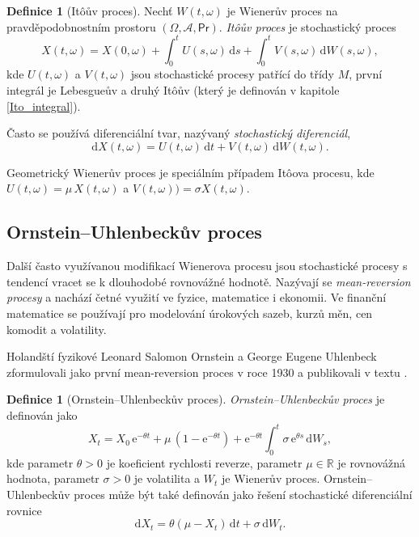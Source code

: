 \documentclass[a4paper,12pt]{report}
\theoremstyle{definition} \newtheorem{definice}[veta]{Definice}
\theoremstyle{remark}
\begin{document}
\begin{definice}[It\^oův proces]
Nechť $W(t,\omega)$ je Wienerův proces na pravděpodobnostním prostoru $(\Omega,\mathcal{A},\mathsf{Pr})$.
\textit{It\^oův proces} je stochastický proces
$$X(t,\omega)=X(0,\omega)+\int_0^tU(s,\omega)\,\mathrm{d}s+\int_0^tV(s,\omega)\,\mathrm{d}W(s,\omega),$$
kde $U(t,\omega)$ a $V(t,\omega)$ jsou stochastické procesy patřící do třídy $M$,
první integrál je Lebesgueův a druhý It\^oův (který je definován v kapitole \ref{Ito_integral}).

Často se používá diferenciální tvar, nazývaný \textit{stochastický diferenciál},
$$\mathrm{d}X(t,\omega)=U(t,\omega)\,\mathrm{d}t+V(t,\omega)\,\mathrm{d}W(t,\omega).$$
\end{definice}

Geometrický Wienerův proces je speciálním případem It\^oova procesu, kde $U(t,\omega)=\mu\,X(t,\omega)$ a $V(t,\omega))=\sigma X(t,\omega)$.

\subsection{Ornstein–Uhlenbeckův proces}
Další často využívanou modifikací Wienerova procesu jsou stochastické procesy s tendencí vracet se k dlouhodobé rovnovážné hodnotě.
Nazývají se \textit{mean-reversion procesy} a nachází četné využití ve fyzice, matematice i ekonomii.
Ve finanční matematice se používají pro modelování úrokových sazeb, kurzů měn, cen komodit a volatility.

Holandští fyzikové Leonard Salomon Ornstein a George Eugene Uhlenbeck zformulovali jako první mean-reversion proces v roce 1930 a publikovali v textu \cite{OrnsteinUhlenbeck1930}. 

\begin{definice}[Ornstein–Uhlenbeckův proces]
\textit{Ornstein–Uhlenbeckův proces} je definován jako
\begin{equation}\label{OUP}
X_t = X_0\,\mathrm{e}^{-\theta t} + \mu\,(1-\mathrm{e}^{-\theta t}) + \mathrm{e}^{-\theta t}\int_0^t \sigma\,\mathrm{e}^{\theta s}\,\mathrm{d}W_s,
\end{equation}
kde parametr $\theta>0$ je koeficient rychlosti reverze, parametr $\mu\in\mathbb{R}$ je rovnovážná hodnota, parametr $\sigma>0$ je volatilita a $W_t$ je Wienerův proces.
Ornstein–Uhlenbeckův proces může být také definován jako řešení stochastické diferenciální rovnice
\begin{equation}\label{SDE_OUP}
\mathrm{d}X_t = \theta(\mu-X_t)\,\mathrm{d}t + \sigma\,\mathrm{d}W_t.
\end{equation}
\end{definice}
\end{document}

